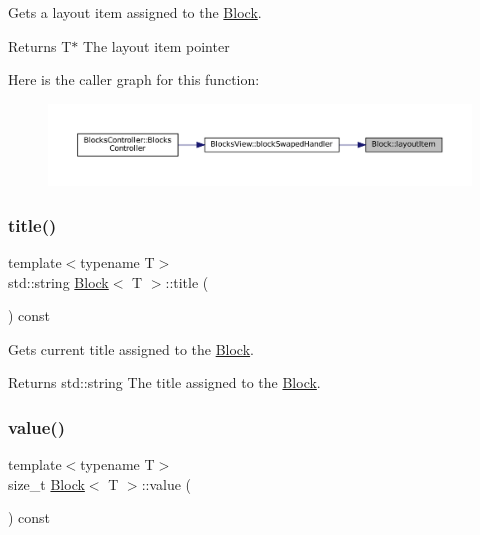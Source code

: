 Gets a layout item assigned to the \mbox{\hyperlink{class_block}{Block}}. 

\begin{DoxyReturn}{Returns}
T$\ast$ The layout item pointer 
\end{DoxyReturn}
Here is the caller graph for this function\+:
\nopagebreak
\begin{figure}[H]
\begin{center}
\leavevmode
\includegraphics[width=350pt]{class_block_adebc177a35bfd2ecaebd8fc23a6ceafb_icgraph}
\end{center}
\end{figure}
\mbox{\label{class_block_a48197972162fbfe6b2f4d721d80034cf}} 
\subsubsection{\texorpdfstring{title()}{title()}}
{\footnotesize\ttfamily template$<$typename T$>$ \\
std\+::string \mbox{\hyperlink{class_block}{Block}}$<$ T $>$\+::title (\begin{DoxyParamCaption}{ }\end{DoxyParamCaption}) const\hspace{0.3cm}{\ttfamily [inline]}}



Gets current title assigned to the \mbox{\hyperlink{class_block}{Block}}. 

\begin{DoxyReturn}{Returns}
std\+::string The title assigned to the \mbox{\hyperlink{class_block}{Block}}. 
\end{DoxyReturn}
\mbox{\label{class_block_ab0b547f273f8d5e4e783ccedaf13ef26}} 
\subsubsection{\texorpdfstring{value()}{value()}}
{\footnotesize\ttfamily template$<$typename T$>$ \\
size\+\_\+t \mbox{\hyperlink{class_block}{Block}}$<$ T $>$\+::value (\begin{DoxyParamCaption}{ }\end{DoxyParamCaption}) const\hspace{0.3cm}{\ttfamily [inline]}}




